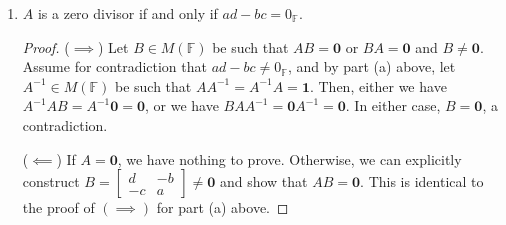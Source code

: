 \documentclass[12pt]{article}
\begin{document}
\begin{enumerate}
{\begin{proof}
        \begin{align*}
            \begin{bmatrix}
                a & b \\ c & d
            \end{bmatrix}
            \left(
            \frac{1}{ad - bc}
            \begin{bmatrix}
                d & -b \\ -c & a
            \end{bmatrix}
            \right) = \frac{1}{ad-bc} \begin{bmatrix}
                ad - bc & -ab + ba \\ cd - dc & -cb + da
            \end{bmatrix} = \begin{bmatrix}1 & 0 \\ 0 & 1 \end{bmatrix}, \\
            \frac{1}{ad - bc}
            \begin{bmatrix}
                d & -b \\ -c & a
            \end{bmatrix}
            \begin{bmatrix}
                a & b \\ c & d
            \end{bmatrix}
            =
            \frac{1}{ad-bc}
            \begin{bmatrix}
                da -bc & db -bd \\ -ca + ac & -cb + ad
            \end{bmatrix} = \begin{bmatrix}1 & 0 \\ 0 & 1\end{bmatrix}.
        \end{align*}
        Thus, $A$ is invertible.
    \end{proof}
}
\item[b.] { $A$ is a zero divisor if and only if $ad - bc = 0_{\mathbb F}$.
\begin{proof}
    ($\implies$) Let $B \in M(\mathbb F)$ be such that $AB = \mathbf 0$ or $BA = \mathbf 0$ and $B \neq \mathbf 0$. Assume for contradiction that $ad - bc \neq 0_{\mathbb F}$, and by part (a) above, let $A^{-1} \in M(\mathbb F)$ be such that $A A^{-1} = A^{-1} A = \mathbf 1$. Then, either we have $A^{-1} A B = A^{-1} \mathbf 0 = \mathbf 0$, or we have $B A A^{-1} = \mathbf 0 A^{-1} = \mathbf 0$. In either case, $B = \mathbf 0$, a contradiction.

    ($\impliedby$) If $A = \mathbf 0$, we have nothing to prove. Otherwise, we can explicitly construct $B = \begin{bmatrix} d & -b \\ -c & a \end{bmatrix} \neq \mathbf 0$ and show that $AB = \mathbf 0$. This is identical to the proof of $(\implies)$ for part (a) above.
\end{proof}

}
\end{enumerate}
\end{document}
